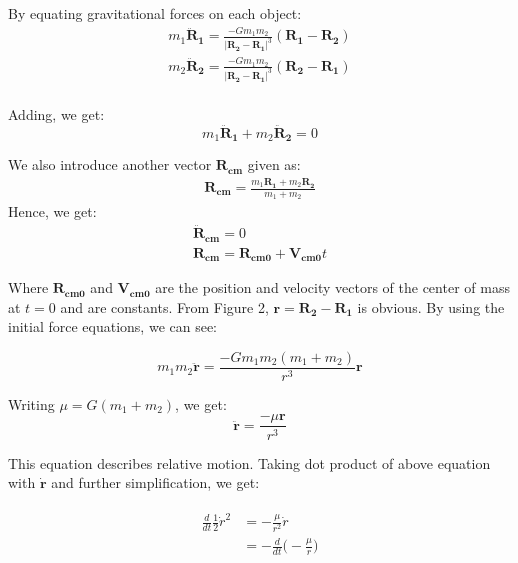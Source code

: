 \documentclass[12pt, letterpaper]{article}
\begin{document}
By equating gravitational forces on each object:
\begin{gather*}
m_1\mathbf{\ddot{R}_{1}} = \frac{-Gm_1m_2}{|\mathbf{R_2} - \mathbf{R_1}|^3}(\mathbf{R_1} - \mathbf{R_2})\\
m_2\mathbf{\ddot{R}_{2}} = \frac{-Gm_1m_2}{|\mathbf{R_2} - \mathbf{R_1}|^3}(\mathbf{R_2} - \mathbf{R_1})\\
\end{gather*}

Adding, we get:
\begin{displaymath}
m_1\mathbf{\ddot{R}_{1}}  + m_2\mathbf{\ddot{R}_{2}} = 0
\end{displaymath}

We also introduce another vector $\mathbf{R_{cm}}$ given as:
\begin{gather*}
\mathbf{R_{cm}} = \frac{m_1\mathbf{R_1}+m_2\mathbf{R_2}}{m_1 + m_2}
\end{gather*}
Hence, we get:
\begin{gather*}
\mathbf{\ddot{R}_{cm}} = 0 \\
\mathbf{R_{cm}} = \mathbf{R_{cm0}} + \mathbf{V_{cm0}}t
\end{gather*}

Where $\mathbf{R_{cm0}}$ and $\mathbf{V_{cm0}}$ are the position and velocity vectors of the center of mass at $t=0$ and are constants. From Figure 2, $\mathbf{r} = \mathbf{R_2} - \mathbf{R_1}$ is obvious. By using the initial force equations, we can see:

\begin{displaymath}
m_1m_2 \mathbf{\ddot{r}} = \frac{-Gm_1m_2(m_1+m_2)}{r^3}\mathbf{r}
\end{displaymath}

Writing $\mu = G(m_1+m_2)$, we get:
\begin{displaymath}
\mathbf{\ddot{r}}  = \frac{-\mu\mathbf{r}}{r^3}
\end{displaymath}

This equation describes relative motion. Taking dot product of above equation with $\mathbf{\dot{r}}$ and further simplification, we get:

\begin{gather*}
\begin{split}
\frac{d}{dt}\frac{1}{2}\dot{r}^2 & = - \frac{\mu}{r^2}\dot{r}\\
								& = - \frac{d}{dt}\Big(-\frac{\mu}{r}\Big)
\end{split}
\end{gather*}
\end{document}

